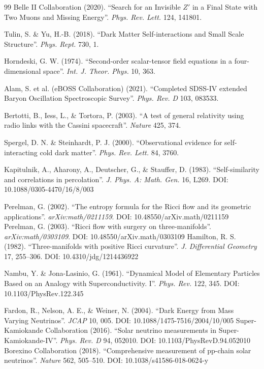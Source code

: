 \documentclass[a4paper,12pt]{article}
\begin{document}
\begin{thebibliography}{99}
 Belle II Collaboration (2020). ``Search for an Invisible $Z'$ in a Final State with Two Muons and Missing Energy''. \textit{Phys. Rev. Lett.} 124, 141801.

 Tulin, S. \& Yu, H.-B. (2018). ``Dark Matter Self-interactions and Small Scale Structure''. \textit{Phys. Rept.} 730, 1.

 Horndeski, G. W. (1974). ``Second-order scalar-tensor field equations in a four-dimensional space''. \textit{Int. J. Theor. Phys.} 10, 363.

 Alam, S. et al. (eBOSS Collaboration) (2021). ``Completed SDSS-IV extended Baryon Oscillation Spectroscopic Survey''. \textit{Phys. Rev. D} 103, 083533.


 Bertotti, B., Iess, L., \& Tortora, P. (2003). ``A test of general relativity using radio links with the Cassini spacecraft''. \textit{Nature} 425, 374.

 Spergel, D. N. \& Steinhardt, P. J. (2000). ``Observational evidence for self-interacting cold dark matter''. \textit{Phys. Rev. Lett.} 84, 3760.

 Kapitulnik, A., Aharony, A., Deutscher, G., \& Stauffer, D. (1983). ``Self-similarity and correlations in percolation''. \textit{J. Phys. A: Math. Gen.} 16, L269. DOI: 10.1088/0305-4470/16/8/003


 Perelman, G. (2002). ``The entropy formula for the Ricci flow and its geometric applications''. \textit{arXiv:math/0211159}. DOI: 10.48550/arXiv.math/0211159
 Perelman, G. (2003). ``Ricci flow with surgery on three-manifolds''. \textit{arXiv:math/0303109}. DOI: 10.48550/arXiv.math/0303109
 Hamilton, R. S. (1982). ``Three-manifolds with positive Ricci curvature''. \textit{J. Differential Geometry} 17, 255--306. DOI: 10.4310/jdg/1214436922

 Nambu, Y. \& Jona-Lasinio, G. (1961). ``Dynamical Model of Elementary Particles Based on an Analogy with Superconductivity. I''. \textit{Phys. Rev.} 122, 345. DOI: 10.1103/PhysRev.122.345

 Fardon, R., Nelson, A. E., \& Weiner, N. (2004). ``Dark Energy from Mass Varying Neutrinos''. \textit{JCAP} 10, 005. DOI: 10.1088/1475-7516/2004/10/005
 Super-Kamiokande Collaboration (2016). ``Solar neutrino measurements in Super-Kamiokande-IV''. \textit{Phys. Rev. D} 94, 052010. DOI: 10.1103/PhysRevD.94.052010
 Borexino Collaboration (2018). ``Comprehensive measurement of pp-chain solar neutrinos''. \textit{Nature} 562, 505--510. DOI: 10.1038/s41586-018-0624-y


\end{thebibliography}
\end{document}
